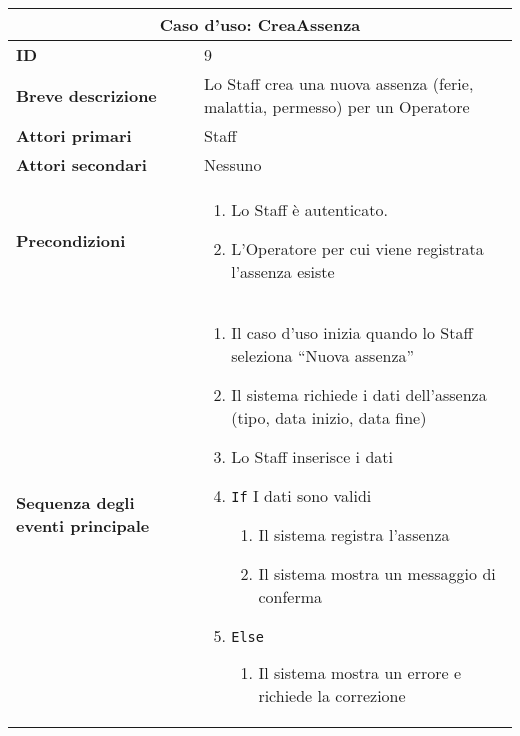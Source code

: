 \documentclass[a4paper]{report}
\begin{document}
\clearpage
\renewcommand{\arraystretch}{1.9}
\begin{table}[H]
\vspace*{-0cm}
\begin{tabular}{|p{3.9cm}|p{9.9cm}|}
\hline
\multicolumn{2}{|c|}{\textbf{Caso d’uso: CreaAssenza}} \\ \hline
\textbf{ID} & 9 \\ \hline
\textbf{Breve descrizione} & Lo Staff crea una nuova assenza (ferie, malattia, permesso) per un Operatore \\ \hline
\textbf{Attori primari} & Staff \\ \hline
\textbf{Attori secondari} & Nessuno \\ \hline
\textbf{Precondizioni} & \begin{enumerate}[leftmargin=14pt,label=\arabic*.,labelsep=0.5em,topsep=0pt,partopsep=0pt,parsep=0pt,itemsep=0pt]
    \item Lo Staff è autenticato.
    \item L’Operatore per cui viene registrata l’assenza esiste
\end{enumerate} \\ \hline
\textbf{Sequenza degli eventi principale} & \begin{enumerate}[leftmargin=14pt,label=\arabic*.,labelsep=0.5em,topsep=0pt,partopsep=0pt,parsep=0pt,itemsep=0pt]
    \item Il caso d’uso inizia quando lo Staff seleziona “Nuova assenza”
    \item Il sistema richiede i dati dell’assenza (tipo, data inizio, data fine)
    \item Lo Staff inserisce i dati
    \item \texttt{If} I dati sono validi
    \begin{enumerate}[label=\arabic{enumi}.\arabic*.,leftmargin=22pt,labelsep=0.5em,topsep=0pt,partopsep=0pt,parsep=0pt,itemsep=0pt]
        \item Il sistema registra l’assenza
        \item Il sistema mostra un messaggio di conferma
    \end{enumerate}
    \item \texttt{Else}
    \begin{enumerate}[label=\arabic{enumi}.\arabic*.,leftmargin=22pt,labelsep=0.5em,topsep=0pt,partopsep=0pt,parsep=0pt,itemsep=0pt]
        \item Il sistema mostra un errore e richiede la correzione
    \end{enumerate}

\end{enumerate}
\end{tabular}
\end{table}
\end{document}
